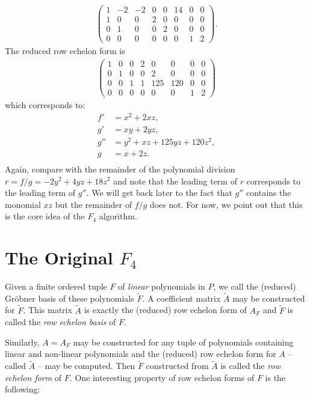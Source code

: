 \begin{align*}
\left(\begin{array}{rrrrrrrr}
1 & -2 & -2 & 0 & 0 & 14 & 0 & 0 \\
1 & 0 & 0 & 2 & 0 & 0 & 0 & 0 \\
0 & 1 & 0 & 0 & 2 & 0 & 0 & 0 \\
0 & 0 & 0 & 0 & 0 & 0 & 1 & 2
\end{array}\right).
\end{align*}
The reduced row echelon form is
\begin{align*}
\left(\begin{array}{rrrrrrrr}
1 & 0 & 0 & 2 & 0 & 0 & 0 & 0 \\
0 & 1 & 0 & 0 & 2 & 0 & 0 & 0 \\
0 & 0 & 1 & 1 & 125 & 120 & 0 & 0 \\
0 & 0 & 0 & 0 & 0 & 0 & 1 & 2
\end{array}\right)
\end{align*}
which corresponds to:
\begin{align*}
f' &= x^{2} + 2 x z,\\
g' & = x y + 2 y z,\\
g'' &= y^{2} + x z + 125 y z + 120 z^{2},\\
g &= x + 2 z.\\
\end{align*}
Again, compare with the remainder of the polynomial division $r = f/g = -2y^2 + 4yz + 18z^2$ and note that the leading term of $r$ corresponds to the leading term of $g''$. We will get back later to the fact that $g''$ contains the monomial $xz$ but the remainder of $f/g$ does not. For now, we point out that this is the core idea of the $F_4$ algorithm.

\section{The Original \texorpdfstring{$F_4$}{F4}}

Given a finite ordered tuple $F$ of \emph{linear} polynomials in $P$, we call the (reduced) Gröbner basis of these polynomials $\tilde{F}$. A coefficient matrix
$\tilde{A}$ may be constructed for $\tilde{F}$. This matrix $\tilde{A}$ is exactly the (reduced) row echelon form of $A_F$ and $\tilde{F}$ is called the \emph{row
echelon basis} of $F$.

Similarly, $A=A_F$ may be constructed for any tuple of polynomials containing linear and non-linear polynomials and the (reduced) row echelon form for $A$ -- called $\tilde{A}$ -- may be computed. Then $\tilde{F}$ constructed from $\tilde{A}$ is called the \emph{row echelon form} of $F$. One interesting property of row echelon forms of $F$ is the following:

